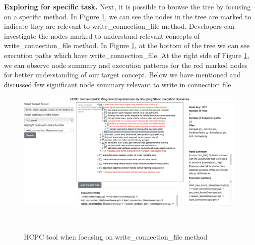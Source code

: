 \textbf{Exploring for specific task. } Next, it is possible to browse the tree by focusing on a specific method. In Figure \ref{fig:tool_write_connection_file}, we can see the nodes in the tree are marked to indicate they are relevant to write\_connection\_file method. Developers can investigate the nodes marked to understand relevant concepts of write\_connection\_file method. In Figure \ref{fig:tool_write_connection_file}, at the bottom of the tree we can see execution paths which have write\_connection\_file. At the right side of Figure \ref{fig:tool_write_connection_file}, we can observe node summary and execution patterns for the red marked nodes for better understanding of our target concept. Below we have mentioned and discussed few significant node summary relevant to write in connection file.  

\begin{figure}[h]
  \centering
  \includegraphics[width=\columnwidth]{figures/hla3/hla3_write_connection_file.png}
  \caption{HCPC tool when focusing on write\_connection\_file method }~\label{fig:tool_write_connection_file}
\end{figure}

